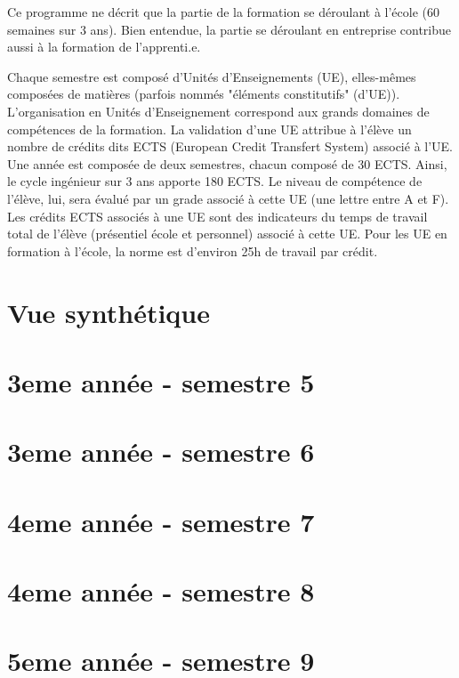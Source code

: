 \documentclass[a4paper, 11pt]{article}
\begin{document}
Ce programme ne décrit que la partie de la formation se déroulant à l'école (60 semaines sur 3 ans). Bien entendue, la partie se déroulant en entreprise contribue aussi à la formation de l'apprenti.e.

Chaque semestre est composé d'Unités d'Enseignements (UE), elles-mêmes composées de matières (parfois nommés "éléments constitutifs" (d'UE)). L'organisation en Unités d'Enseignement correspond aux grands domaines de compétences de la formation. La validation d'une UE attribue à l'élève un nombre de crédits dits ECTS (European Credit Transfert System) associé à l'UE. Une année est composée de deux semestres, chacun composé de 30 ECTS. Ainsi, le cycle ingénieur sur 3 ans apporte 180 ECTS. Le niveau de compétence de l'élève, lui, sera évalué par un grade associé à cette UE (une lettre entre A et F). Les crédits ECTS associés à une UE sont des indicateurs du temps de travail total de l'élève (présentiel école et personnel) associé à cette UE. Pour les UE en formation à l'école, la norme est d'environ 25h de travail par crédit.  
 
\pagebreak

\tableofcontents
\pagebreak 
\part{Vue synthétique}
 \pagebreak
 \pagebreak
 \pagebreak
 \pagebreak

\part{3eme année - semestre 5}





\part{3eme année - semestre 6}





\part{4eme année - semestre 7}





\part{4eme année - semestre 8}





\part{5eme année - semestre 9}




\end{document}
